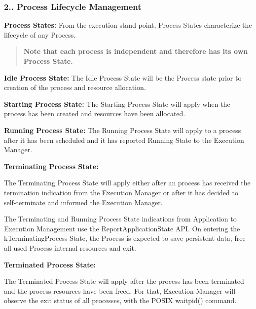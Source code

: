 \subsubsection*{2.. {\bfseries Process Lifecycle Management}}


\begin{DoxyItemize}
\item {\bfseries Process States\+:} From the execution stand point, Process States characterize the lifecycle of any Process. \begin{quote}
{\bfseries Note that each process is independent and therefore has its own Process State.} \end{quote}

\begin{DoxyItemize}
\item {\bfseries Idle Process State\+:} The Idle Process State will be the Process state prior to creation of the process and resource allocation.
\item {\bfseries Starting Process State\+:} The Starting Process State will apply when the process has been created and resources have been allocated.
\item {\bfseries Running Process State\+:} The Running Process State will apply to a process after it has been scheduled and it has reported Running State to the Execution Manager.
\item {\bfseries Terminating Process State\+:}
\begin{DoxyItemize}
\item The Terminating Process State will apply either after an process has received the termination indication from the Execution Manager or after it has decided to self-\/terminate and informed the Execution Manager.
\item The Terminating and Running Process State indications from Application to Execution Management use the Report\+Application\+State A\+PI. On entering the k\+Terminating\+Process State, the Process is expected to save persistent data, free all used Process internal resources and exit.
\end{DoxyItemize}
\item {\bfseries Terminated Process State\+:}
\begin{DoxyItemize}
\item The Terminated Process State will apply after the process has been terminated and the process resources have been freed. For that, Execution Manager will observe the exit status of all processes, with the P\+O\+S\+IX waitpid() command.

\end{DoxyItemize}
\end{DoxyItemize}
\end{DoxyItemize}
